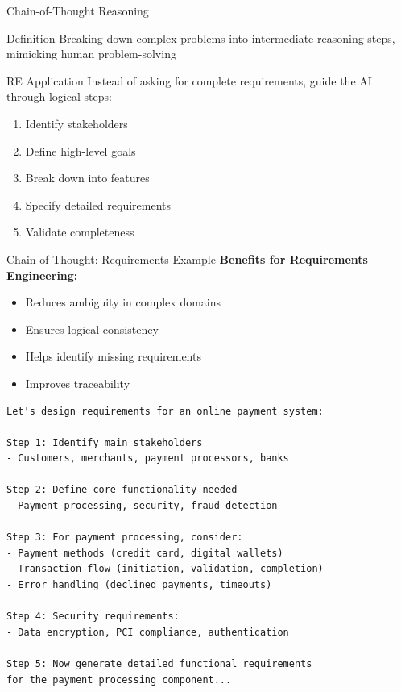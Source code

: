 \documentclass{beamer}
\begin{document}
\begin{frame}[t]{Chain-of-Thought Reasoning}
    \begin{block}{Definition}
        Breaking down complex problems into intermediate reasoning steps, mimicking human problem-solving
    \end{block}
    
    \begin{exampleblock}{RE Application}
        Instead of asking for complete requirements, guide the AI through logical steps:
        \scriptsize
        \begin{enumerate}
            \item Identify stakeholders
            \item Define high-level goals
            \item Break down into features
            \item Specify detailed requirements
            \item Validate completeness
        \end{enumerate}
    \end{exampleblock}
    
\end{frame}

\begin{frame}[t, fragile]{Chain-of-Thought: Requirements Example}
    \textbf{Benefits for Requirements Engineering:}
    \scriptsize
    \begin{itemize}
        \item Reduces ambiguity in complex domains
        \item Ensures logical consistency
        \item Helps identify missing requirements
        \item Improves traceability
    \end{itemize}
    \begin{lstlisting}[style=code, caption={Chain-of-Thought for Payment System}]
Let's design requirements for an online payment system:

Step 1: Identify main stakeholders
- Customers, merchants, payment processors, banks

Step 2: Define core functionality needed
- Payment processing, security, fraud detection

Step 3: For payment processing, consider:
- Payment methods (credit card, digital wallets)
- Transaction flow (initiation, validation, completion)
- Error handling (declined payments, timeouts)

Step 4: Security requirements:
- Data encryption, PCI compliance, authentication

Step 5: Now generate detailed functional requirements 
for the payment processing component...
    \end{lstlisting}
\end{frame}
\end{document}
